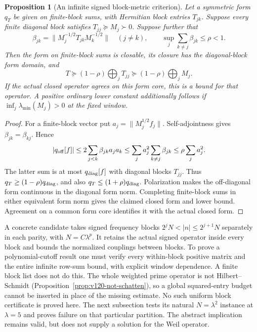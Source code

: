 \documentclass[11pt]{article}
\newtheorem{proposition}[theorem]{Proposition}
\theoremstyle{remark}
\begin{document}
\begin{proposition}[An infinite signed block-metric criterion]
\label{prop:v127-block-metric}
Let a symmetric form $q_T$ be given on finite-block sums,
with Hermitian block entries $T_{jk}$. Suppose every finite diagonal
block satisfies $T_{jj}\succeq M_j\succ0$. Suppose further that
\[
 \beta_{jk}=\|M_j^{-1/2}T_{jk}M_k^{-1/2}\|\quad(j\ne k),\qquad
 \sup_j\sum_{k\ne j}\beta_{jk}\le\rho<1.
\]
Then the form on finite-block sums is closable, its closure has the
diagonal-block form domain, and
\[
 T\succeq(1-\rho)\bigoplus_jT_{jj}
   \succeq(1-\rho)\bigoplus_jM_j.
\]
If the actual closed operator agrees on this form core, this is a
bound for that operator. A positive ordinary lower constant additionally
follows if $\inf_j\lambda_{\min}(M_j)>0$ at the fixed window.
\end{proposition}
\begin{proof}
For a finite-block vector put $a_j=\|M_j^{1/2}f_j\|$.
Self-adjointness gives $\beta_{jk}=\beta_{kj}$. Hence
\[
 |q_{\rm off}[f]|\le2\sum_{j<k}\beta_{jk}a_ja_k
 \le\sum_j a_j^2\sum_{k\ne j}\beta_{jk}
 \le\rho\sum_j a_j^2.
\]
The latter sum is at most $q_{\rm diag}[f]$ with diagonal blocks
$T_{jj}$. Thus $q_T\ge(1-\rho)q_{\rm diag}$, and also
$q_T\le(1+\rho)q_{\rm diag}$. Polarization makes the off-diagonal
form continuous in the diagonal form norm. Completing finite-block
sums in either equivalent form norm gives the claimed closed form
and lower bound. Agreement on a common form core identifies it with
the actual closed form.
\end{proof}

A concrete candidate takes signed frequency blocks
$2^jN<|n|\le2^{j+1}N$ separately in each parity, with
$N=C\lambda^p$. It retains the actual signed operator inside every
block and bounds the normalized couplings between blocks. To prove
a polynomial-cutoff result one must verify every within-block positive
matrix and the entire infinite row-sum bound, with explicit window
dependence. A finite block list does not do this. The whole weighted
prime operator is not Hilbert--Schmidt
(Proposition~\ref{prop:v120-not-schatten}), so a global squared-entry
budget cannot be inserted in place of the missing estimate.
No such uniform block certificate is proved here. The next subsection
tests its natural $N=\lambda^2$ instance at $\lambda=5$ and proves
failure on that particular partition. The abstract implication remains
valid, but does not supply a solution for the Weil operator.
\end{document}
